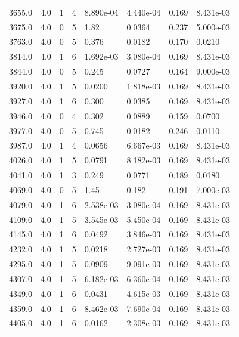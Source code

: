 \documentclass[preview]{standalone}
\begin{document}
{{{{\begin{tabular}{L{1.2cm}C{1.2cm} C{0.3cm}C{0.5cm} C{1.4cm}C{1.4cm} C{1.4cm}C{1.4cm}}
  3655.0  &   4.0  & 1     &  4 &  8.890e-04  & 4.440e-04  & 0.169 &  8.431e-03   \\ 
  3675.0  &   4.0  & 0     &  5 &  1.82  & 0.0364  & 0.237 &  5.000e-03   \\ 
  3763.0  &   4.0  & 0     &  5 &  0.376  & 0.0182  & 0.170 &  0.0210   \\ 
  3814.0  &   4.0  & 1     &  6 &  1.692e-03  & 3.080e-04  & 0.169 &  8.431e-03   \\ 
  3844.0  &   4.0  & 0     &  5 &  0.245  & 0.0727  & 0.164 &  9.000e-03   \\ 
  3920.0  &   4.0  & 1     &  5 &  0.0200  & 1.818e-03  & 0.169 &  8.431e-03   \\ 
  3927.0  &   4.0  & 1     &  6 &  0.300  & 0.0385  & 0.169 &  8.431e-03   \\ 
  3946.0  &   4.0  & 0     &  4 &  0.302  & 0.0889  & 0.159 &  0.0700   \\ 
  3977.0  &   4.0  & 0     &  5 &  0.745  & 0.0182  & 0.246 &  0.0110   \\ 
  3987.0  &   4.0  & 1     &  4 &  0.0656  & 6.667e-03  & 0.169 &  8.431e-03   \\ 
  4026.0  &   4.0  & 1     &  5 &  0.0791  & 8.182e-03  & 0.169 &  8.431e-03   \\ 
  4041.0  &   4.0  & 1     &  3 &  0.249  & 0.0771  & 0.189 &  0.0180   \\ 
  4069.0  &   4.0  & 0     &  5 &  1.45  & 0.182  & 0.191 &  7.000e-03   \\ 
  4079.0  &   4.0  & 1     &  6 &  2.538e-03  & 3.080e-04  & 0.169 &  8.431e-03   \\ 
  4109.0  &   4.0  & 1     &  5 &  3.545e-03  & 5.450e-04  & 0.169 &  8.431e-03   \\ 
  4145.0  &   4.0  & 1     &  6 &  0.0492  & 3.846e-03  & 0.169 &  8.431e-03   \\ 
  4232.0  &   4.0  & 1     &  5 &  0.0218  & 2.727e-03  & 0.169 &  8.431e-03   \\ 
  4295.0  &   4.0  & 1     &  5 &  0.0909  & 9.091e-03  & 0.169 &  8.431e-03   \\ 
  4307.0  &   4.0  & 1     &  5 &  6.182e-03  & 6.360e-04  & 0.169 &  8.431e-03   \\ 
  4349.0  &   4.0  & 1     &  6 &  0.0431  & 4.615e-03  & 0.169 &  8.431e-03   \\ 
  4359.0  &   4.0  & 1     &  6 &  8.462e-03  & 7.690e-04  & 0.169 &  8.431e-03   \\ 
  4405.0  &   4.0  & 1     &  6 &  0.0162  & 2.308e-03  & 0.169 &  8.431e-03   \\ 

\end{tabular}}}}}
\end{document}
